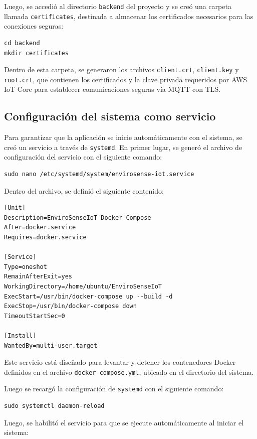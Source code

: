 Luego, se accedió al directorio \texttt{backend} del proyecto y se creó una
carpeta llamada \texttt{certificates}, destinada a almacenar los certificados
necesarios para las conexiones seguras:

\begin{verbatim}
cd backend
mkdir certificates
\end{verbatim}

Dentro de esta carpeta, se generaron los archivos \texttt{client.crt},
\texttt{client.key} y \texttt{root.crt}, que contienen los certificados y la
clave privada requeridos por AWS IoT Core para establecer comunicaciones
seguras vía MQTT con TLS.

\subsection{Configuración del sistema como servicio}

Para garantizar que la aplicación se inicie automáticamente con el sistema, se
creó un servicio a través de \texttt{systemd}. En primer lugar, se generó el
archivo de configuración del servicio con el siguiente comando:

\begin{verbatim}
sudo nano /etc/systemd/system/envirosense-iot.service
\end{verbatim}

Dentro del archivo, se definió el siguiente contenido:

\begin{verbatim}
[Unit]
Description=EnviroSenseIoT Docker Compose
After=docker.service
Requires=docker.service

[Service]
Type=oneshot
RemainAfterExit=yes
WorkingDirectory=/home/ubuntu/EnviroSenseIoT
ExecStart=/usr/bin/docker-compose up --build -d
ExecStop=/usr/bin/docker-compose down
TimeoutStartSec=0

[Install]
WantedBy=multi-user.target
\end{verbatim}

Este servicio está diseñado para levantar y detener los contenedores Docker
definidos en el archivo \texttt{docker-compose.yml}, ubicado en el directorio
del sistema.

Luego se recargó la configuración de \texttt{systemd} con el siguiente
comando:

\begin{verbatim}
sudo systemctl daemon-reload
\end{verbatim}

Luego, se habilitó el servicio para que se ejecute automáticamente al iniciar
el sistema:

